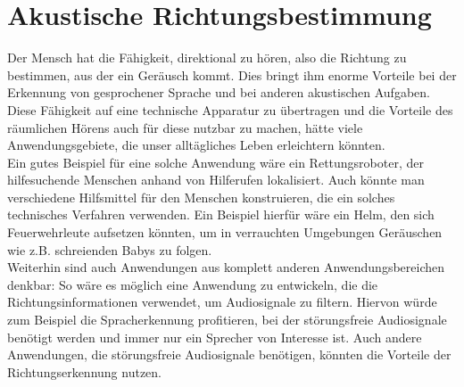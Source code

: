 \section{Akustische Richtungsbestimmung} Der Mensch hat die Fähigkeit, direktional zu hören, also die Richtung zu bestimmen, aus der ein Geräusch kommt. Dies bringt ihm enorme Vorteile bei der Erkennung von gesprochener Sprache und bei anderen akustischen Aufgaben. Diese Fähigkeit auf eine technische Apparatur zu übertragen und die Vorteile des räumlichen Hörens auch für diese nutzbar zu machen, hätte viele Anwendungsgebiete, die unser alltägliches Leben erleichtern könnten.\\
Ein gutes Beispiel für eine solche Anwendung wäre ein Rettungsroboter, der hilfesuchende Menschen anhand von Hilferufen lokalisiert. Auch könnte man verschiedene Hilfsmittel für den Menschen konstruieren, die ein solches technisches Verfahren verwenden. Ein Beispiel hierfür wäre ein Helm, den sich Feuerwehrleute aufsetzen könnten, um in verrauchten Umgebungen Geräuschen wie z.B. schreienden Babys zu folgen.\\
Weiterhin sind auch Anwendungen aus komplett anderen Anwendungsbereichen denkbar: So wäre es möglich eine Anwendung zu entwickeln, die die Richtungsinformationen verwendet, um Audiosignale zu filtern. Hiervon würde zum Beispiel die Spracherkennung profitieren, bei der  störungsfreie Audiosignale benötigt werden und immer nur ein Sprecher von Interesse ist\cite{Spracherkennung}. Auch andere Anwendungen, die störungsfreie Audiosignale benötigen, könnten die Vorteile der Richtungserkennung nutzen. 
